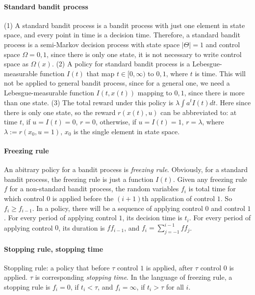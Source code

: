 \paragraph{Standard bandit process}
(1) A standard bandit process is a bandit process with just one element in state space, and every 
point in time is a decision time. Therefore, a standard bandit process is a semi-Markov decision
process with state space $|\Theta| = 1$ and control space $\Omega = {0,1}$, since there is only
one state, it is not necessary to write control space as $\Omega(x)$. (2) A policy for standard
bandit process is a Lebesgue-measurable function $I(t)$ that map $t\in[0,\infty)$ to ${0,1}$, where
$t$ is time. This will not be applied to general bandit process, since for a general one, we need
a Lebesgue-measurable function $I(t,x(t))$ mapping to ${0,1}$, since there is more than one state.
(3) The total reward under this policy is $\lambda \int a^t I(t) dt$. Here since there 
is only one state, so the reward $r(x(t), u)$ can be abbreviated to: at time $t$, if $u = I(t) = 0$,
$r=0$, otherwise, if $u = I(t) = 1$, $r=\lambda$, where $\lambda := r(x_0,u=1)$, $x_0$ is the single
element in state space.

\paragraph{Freezing rule}
An abitrary policy for a bandit process is \textit{freezing rule}. Obviously, for a standard bandit
process, the freezing rule is just a function $I(t)$. Given any freezing rule $f$ for a non-standard
bandit process, the random variables $f_i$ is total time for which control $0$ is applied before the
$(i+1)$th application of control $1$. So $f_i \geq f_{i-1}$. In a policy, there will be a sequence of 
applying control $0$ and control $1$. For every period of applying control $1$, its decision time is $t_i$.
For every period of applying control $0$, its duration is $ff_{i-1}$, and $f_i = \sum_{j=-1}^{i-1} ff_j$.

\paragraph{Stopping rule, stopping time}
Stoppling rule: a policy that before $\tau$ control $1$ is applied, after $\tau$ control $0$ is applied.
$\tau$ is corresponding \textit{stopping time}. In the language of freezing rule, a stopping rule is 
$f_i = 0$, if $t_i < \tau$, and $f_i = \infty$, if $t_i > \tau$ for all $i$.


